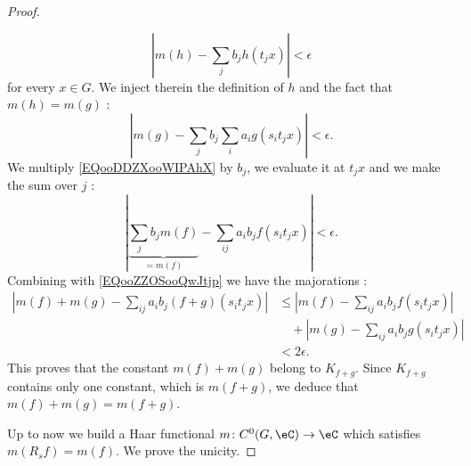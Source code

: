 \begin{proof}
\begin{subproof}
\begin{equation}
			| m(h)-\sum_{j}b_jh(t_jx) |<\epsilon
		\end{equation}
		for every \( x\in G\). We inject therein the definition of \( h\) and the fact that \( m(h)=m(g)\) :
		\begin{equation}        \label{EQooZZOSooQwJtjp}
			| m(g)-\sum_jb_j\sum_ia_ig(s_it_jx) |<\epsilon.
		\end{equation}
		We multiply \eqref{EQooDDZXooWIPAhX} by \( b_j\), we evaluate it at \(t_jx\) and we make the sum over \( j\) :
		\begin{equation}
			| \underbrace{\sum_jb_jm(f)}_{=m(f)}-\sum_{ij}a_ib_jf(s_it_jx) |<\epsilon.
		\end{equation}
		Combining with \eqref{EQooZZOSooQwJtjp} we have the majorations :
		\begin{subequations}
			\begin{align}
				| m(f)+m(g)-\sum_{ij}a_ib_j(f+g)(s_it_jx) | & \leq | m(f)-\sum_{ij}a_ib_jf(s_it_jx) |              \\
				                                            & \quad+| m(g)-\sum_{ij}a_ib_jg(s_it_jx) |   \nonumber \\
				                                            & <2\epsilon.
			\end{align}
		\end{subequations}
		This proves that the constant \( m(f)+m(g)\) belong to \( K_{f+g}\). Since \( K_{f+g}\) contains only one constant, which is \( m(f+g)\), we deduce that \( m(f)+m(g)=m(f+g)\).
	\end{subproof}
	Up to now we build a Haar functional \( m\colon C^0(G,\eC)\to \eC\) which satisfies \( m(R_sf)=m(f)\). We prove the unicity.


\end{proof}
